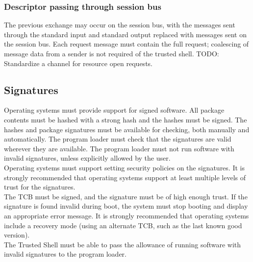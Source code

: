 \subsubsection{Descriptor passing through session bus}
The previous exchange may occur on the session bus, with the messages sent through the standard input and standard output replaced with messages sent on the session bus. Each request message must contain the full request; coalescing of message data from a sender is not required of the trusted shell.
TODO: Standardize a channel for resource open requests.
\subsection{Signatures}
Operating systems must provide support for signed software. All package contents must be hashed with a strong hash and the hashes must be signed. The hashes and package signatures must be available for checking, both manually and automatically. The program loader must check that the signatures are valid wherever they are available. The program loader must not run software with invalid signatures, unless explicitly allowed by the user.\\
Operating systems must support setting security policies on the signatures. It is strongly recommended that operating systems support at least multiple levels of trust for the signatures.\\
The TCB must be signed, and the signature must be of high enough trust. If the signature is found invalid during boot, the system must stop booting and display an appropriate error message. It is strongly recommended that operating systems include a recovery mode (using an alternate TCB, such as the last known good version).\\
The Trusted Shell must be able to pass the allowance of running software with invalid signatures to the program loader.